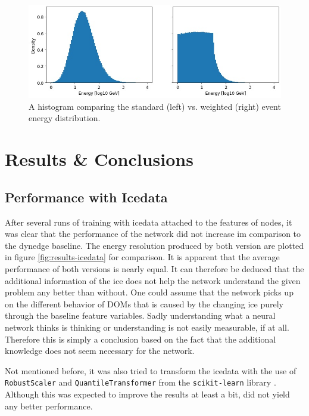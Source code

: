 \documentclass[a4paper,10pt]{scrartcl}
\begin{document}
\begin{figure}[h]
    \includegraphics[width=\textwidth]{images/loss-weights.jpg}
    \centering
    \caption{A histogram comparing the standard (left) vs. weighted (right) event energy distribution.}
    \label{fig:weighted-loss}
\end{figure}


\section{Results \& Conclusions}

\subsection{Performance with Icedata}

After several runs of training with icedata attached to the features of nodes, it was clear that the performance of the network did not increase im comparison to the dynedge baseline.
The energy resolution produced by both version are plotted in figure \ref{fig:results-icedata} for comparison.
It is apparent that the average performance of both versions is nearly equal.
It can therefore be deduced that the additional information of the ice does not help the network understand the given problem any better than without.
One could assume that the network picks up on the different behavior of DOMs that is caused by the changing ice purely through the baseline feature variables.
Sadly understanding what a neural network thinks is thinking or understanding is not easily measurable, if at all.
Therefore this is simply a conclusion based on the fact that the additional knowledge does not seem necessary for the network.

Not mentioned before, it was also tried to transform the icedata with the use of \texttt{RobustScaler} and \texttt{QuantileTransformer} from the \texttt{scikit-learn} library \cite{scikit-learn}.
Although this was expected to improve the results at least a bit, did not yield any better performance.
\end{document}
